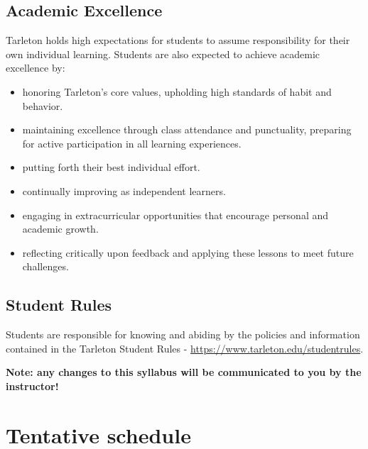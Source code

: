\documentclass[10pt]{article}
\begin{document}
\subsection*{Academic Excellence}
\label{sec:orgd3652bd}
Tarleton holds high expectations for students to assume responsibility for their own individual learning. Students are also expected to achieve academic excellence by:
\begin{itemize}
\item honoring Tarleton’s core values, upholding high standards of habit and behavior.
\item maintaining excellence through class attendance and punctuality, preparing for active participation in all learning experiences.
\item putting forth their best individual effort.
\item continually improving as independent learners.
\item engaging in extracurricular opportunities that encourage personal and academic growth.
\item reflecting critically upon feedback and applying these lessons to meet future challenges.
\end{itemize}

\subsection*{Student Rules}
\label{sec:org8890477}

Students are responsible for knowing and abiding by the policies and information contained in the Tarleton Student Rules - \url{https://www.tarleton.edu/studentrules}.  



\textbf{Note:  any changes to this syllabus will be communicated to you by the instructor!}

\section*{Tentative schedule}
\label{sec:org4d3fceb}
\end{document}
